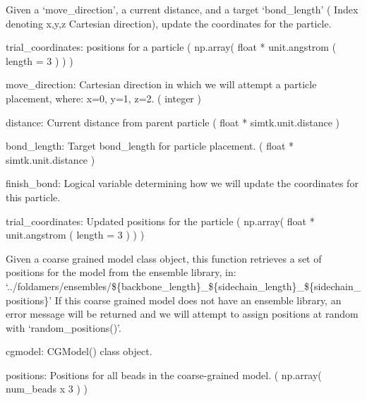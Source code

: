 \documentclass[letterpaper,12pt,english,openany,oneside]{sphinxmanual}
\begin{document}
\begin{fulllineitems}
\label{\detokenize{utilities:utilities.util.get_move}}
Given a ‘move\_direction’, a current distance, and a
target ‘bond\_length’ ( Index denoting x,y,z Cartesian 
direction), update the coordinates for the particle.

trial\_coordinates: positions for a particle
( np.array( float * unit.angstrom ( length = 3 ) ) )

move\_direction: Cartesian direction in which we will
attempt a particle placement, where: x=0, y=1, z=2. 
( integer )

distance: Current distance from parent particle
( float * simtk.unit.distance )

bond\_length: Target bond\_length for particle placement.
( float * simtk.unit.distance )

finish\_bond: Logical variable determining how we will
update the coordinates for this particle.

trial\_coordinates: Updated positions for the particle
( np.array( float * unit.angstrom ( length = 3 ) ) )

\end{fulllineitems}


\begin{fulllineitems}
\label{\detokenize{utilities:utilities.util.get_structure_from_library}}
Given a coarse grained model class object, this function retrieves
a set of positions for the model from the ensemble library, in:
‘../foldamers/ensembles/\$\{backbone\_length\}\_\$\{sidechain\_length\}\_\$\{sidechain\_positions\}’
If this coarse grained model does not have an ensemble library, an 
error message will be returned and we will attempt to assign 
positions at random with ‘random\_positions()’.

cgmodel: CGModel() class object.

positions: Positions for all beads in the coarse-grained model.
( np.array( num\_beads x 3 ) )

\end{fulllineitems}
\end{document}
